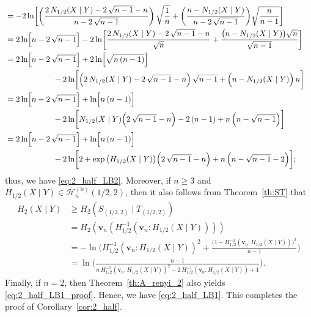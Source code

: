 \documentclass[conference, draftcls, onecolumn]{IEEEtran}
\theoremstyle{plain}
\newcommand{\bvec}[1]{\boldsymbol{#1}}
\newcommand{\thref}[1]{Theorem~\ref{#1}}
\newcommand{\corref}[1]{Corollary~\ref{#1}}
\begin{document}
\begin{IEEEproof}[Proof of \corref{cor:2_half}]
\begin{align}
\\
& =
- 2 \ln \! \bigg[ \bigg( \frac{ 2 \, N_{1/2}(X \mid Y) - 2 \, \sqrt{n-1} - n }{ n - 2 \, \sqrt{n-1} } \bigg) \, \sqrt{ \frac{ 1 }{ n } } + \bigg( \frac{ n - N_{1/2}(X \mid Y) }{ n - 2 \, \sqrt{n-1} } \bigg)  \sqrt{ \frac{ n }{ n - 1 } } \bigg]
\\
& =
2 \ln \! \Big[ n - 2 \, \sqrt{n-1} \Big] - 2 \ln \! \bigg[ \frac{ 2 \, N_{1/2}(X \mid Y) - 2 \, \sqrt{n-1} - n }{ \sqrt{ n } } +  \frac{ \big( n - N_{1/2}(X \mid Y) \big) \sqrt{ n } }{ \sqrt{ n - 1 } } \bigg]
\\
& =
2 \ln \! \Big[ n - 2 \, \sqrt{n-1} \Big] + 2 \ln \! \Big[ \sqrt{ n \, (n - 1) } \Big]
\notag \\
& \qquad \qquad \qquad
- 2 \ln \! \bigg[ \Big( 2 \, N_{1/2}(X \mid Y) - 2 \, \sqrt{n-1} - n \Big) \, \sqrt{ n - 1 } + \Big( n - N_{1/2}(X \mid Y) \Big) \, n \bigg]
\\
& =
2 \ln \! \Big[ n - 2 \, \sqrt{n-1} \Big] + \ln \! \Big[ n \, (n - 1) \Big]
\notag \\
& \qquad \qquad \qquad
- 2 \ln \! \bigg[ N_{1/2}(X \mid Y) \Big( 2 \, \sqrt{ n - 1 } - n \Big) - 2 \, (n-1) + n \, \Big( n - \sqrt{ n - 1 } \Big) \bigg]
\\
& =
2 \ln \! \Big[ n - 2 \, \sqrt{n-1} \Big] + \ln \! \Big[ n \, (n - 1) \Big]
\notag \\
& \qquad \qquad \qquad
- 2 \ln \! \bigg[ 2 + \exp\big( H_{1/2}(X \mid Y) \big) \Big( 2 \, \sqrt{ n - 1 } - n \Big) + n \, \Big( n - \sqrt{ n - 1 } - 2 \Big) \bigg] ;
\end{align}
thus, we have \eqref{eq:2_half_LB2}.
Moreover, if $n \ge 3$ and $H_{1/2}(X \mid Y) \in \mathcal{H}_{n}^{(\mathrm{b})}( 1/2, 2 )$, then it also follows from \thref{th:ST} that
\begin{align}
H_{2}(X \mid Y)
& \ge
H_{2}(S_{(1/2, 2)} \mid T_{(1/2, 2)})
\\
& =
H_{2}( \bvec{v}_{n}( H_{1/2}^{-1}( \bvec{v}_{n} : H_{1/2}(X \mid Y) ) ) )
\\
& =
- \ln \Bigg( H_{1/2}^{-1}( \bvec{v}_{n} : H_{1/2}(X \mid Y) )^{2} + \frac{ \big(1 - H_{1/2}^{-1}( \bvec{v}_{n} : H_{1/2}(X \mid Y) ) \big)^{2} }{ n - 1 } \Bigg)
\\
& =
\ln \Bigg( \frac{ n - 1 }{ n \, H_{1/2}^{-1}( \bvec{v}_{n} : H_{1/2}(X \mid Y) )^{2} - 2 \, H_{1/2}^{-1}( \bvec{v}_{n} : H_{1/2}(X \mid Y) ) + 1 } \Bigg) .
\label{eq:2_half_LB1_proof}
\end{align}
Finally, if $n = 2$, then \thref{th:A_renyi_2} also yields \eqref{eq:2_half_LB1_proof}.
Hence, we have \eqref{eq:2_half_LB1}.
This completes the proof of \corref{cor:2_half}.
\end{IEEEproof}
\end{document}
